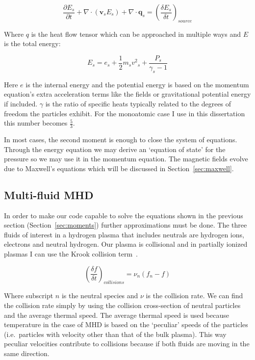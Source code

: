 \documentclass[12pt,upcase]{umlthesis}
\begin{document}
\begin{equation}\label{eq:energyequation}
	\frac{\partial E_s}{\partial t} + \nabla \cdot (\textbf{v}_s E_s) + \nabla \cdot \textbf{q}_s = {(\frac{\delta E_s}{\delta t})}_{source}
\end{equation}

Where $q$ is the heat flow tensor which can be approached in multiple ways and $E$ is the total energy:

\begin{equation}\label{eq:energy}
	E_s = e_s + \frac{1}{2} m_s {v^2}_s + \frac{P_s}{\gamma_s - 1}
\end{equation}

Here $e$ is the internal energy and the potential energy is based on the momentum equation's extra acceleration terms like the fields or gravitational potential energy if included. $\gamma$ is the ratio of specific heats typically related to the degrees of freedom the particles exhibit. For the monoatomic case I use in this dissertation this number becomes $\frac{5}{3}$.

In most cases, the second moment is enough to close the system of equations. Through the energy equation we may derive an `equation of state' for the pressure so we may use it in the momentum equation. The magnetic fields evolve due to Maxwell's equations which will be discussed in Section~\ref{sec:maxwell}. 

\subsection{Multi-fluid MHD}\label{sec:multifluidmhd}

In order to make our code capable to solve the equations shown in the previous section (Section~\ref{sec:moments}) further approximations must be done. The three fluids of interest in a hydrogen plasma that includes neutrals are hydrogen ions, electrons and neutral hydrogen. Our plasma is collisional and in partially ionized plasmas I can use the Krook collision term~\citep{bhatnagar1954}.

\begin{equation}\label{eq:krook}
	{(\frac{\delta f}{\delta t})}_{collisions} = \nu_n (f_n - f)
\end{equation}

Where subscript $n$ is the neutral species and $\nu$ is the collision rate. We can find the collision rate simply by using the collision cross-section of neutral particles and the average thermal speed. The average thermal speed is used because temperature in the case of MHD is based on the `peculiar' speeds of the particles (i.e.\ particles with velocity other than that of the bulk plasma). This way peculiar velocities contribute to collisions because if both fluids are moving in the same direction.
\end{document}

